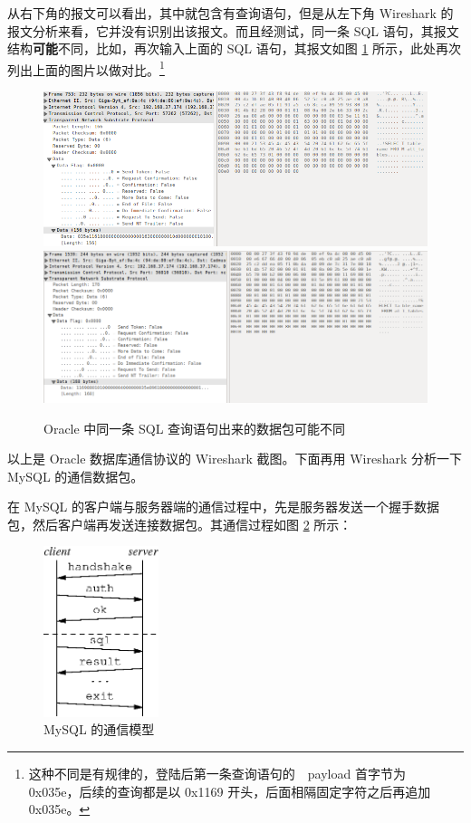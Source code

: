 从右下角的报文可以看出，其中就包含有查询语句，但是从左下角 Wireshark 的报文分析来看，它并没有识别出该报文。而且经测试，同一条 SQL 语句，其报文结构{\bf 可能}不同，比如，再次输入上面的 SQL 语句，其报文如图 \ref{fig:tns-select-diff} 所示，此处再次列出上面的图片以做对比。\footnote{这种不同是有规律的，登陆后第一条查询语句的　payload 首字节为　{\cf 0x035e}，后续的查询都是以 {\cf 0x1169}
开头，后面相隔固定字符之后再追加　{\cf 0x035e}。}

\begin{figure}[ht!]
    \caption{Oracle 中同一条 SQL 查询语句出来的数据包可能不同}
    \label{fig:tns-select-diff}
    \centering
    \includegraphics[width=\textwidth]{tns-select.png}
    \includegraphics[width=\textwidth]{tns-select2.png}
\end{figure}

以上是 Oracle 数据库通信协议的 Wireshark 截图。下面再用 Wireshark 分析一下 MySQL 的通信数据包。

在 MySQL 的客户端与服务器端的通信过程中，先是服务器发送一个握手数据包，然后客户端再发送连接数据包。其通信过程如图 \ref{fig:mysql-comm-module} 所示：

\begin{figure}[h!]
    \caption{MySQL 的通信模型}
    \label{fig:mysql-comm-module}
    \centering
    \includegraphics[width=0.3\textwidth]{mysql-flow.eps}
\end{figure}


